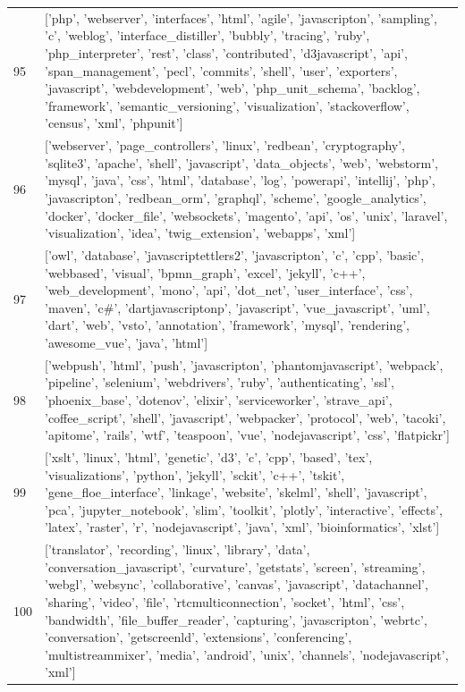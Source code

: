 \begin{center}
\begin{longtable}{|p{1.5cm}|p{12.5cm}|}
            95 & ['php', 'webserver', 'interfaces', 'html', 'agile', 'javascripton', 'sampling', 'c', 'weblog', 'interface\_distiller', 'bubbly', 'tracing', 'ruby', 'php\_interpreter', 'rest', 'class', 'contributed', 'd3javascript', 'api', 'span\_management', 'pecl', 'commits', 'shell', 'user', 'exporters', 'javascript', 'webdevelopment', 'web', 'php\_unit\_schema', 'backlog', 'framework', 'semantic\_versioning', 'visualization', 'stackoverflow', 'census', 'xml', 'phpunit']  \\ 
            96 & ['webserver', 'page\_controllers', 'linux', 'redbean', 'cryptography', 'sqlite3', 'apache', 'shell', 'javascript', 'data\_objects', 'web', 'webstorm', 'mysql', 'java', 'css', 'html', 'database', 'log', 'powerapi', 'intellij', 'php', 'javascripton', 'redbean\_orm', 'graphql', 'scheme', 'google\_analytics', 'docker', 'docker\_file', 'websockets', 'magento', 'api', 'os', 'unix', 'laravel', 'visualization', 'idea', 'twig\_extension', 'webapps', 'xml']  \\ 
            97 & ['owl', 'database', 'javascriptettlers2', 'javascripton', 'c', 'cpp', 'basic', 'webbased', 'visual', 'bpmn\_graph', 'excel', 'jekyll', 'c++', 'web\_development', 'mono', 'api', 'dot\_net', 'user\_interface', 'css', 'maven', 'c\#', 'dartjavascriptonp', 'javascript', 'vue\_javascript', 'uml', 'dart', 'web', 'vsto', 'annotation', 'framework', 'mysql', 'rendering', 'awesome\_vue', 'java', 'html']  \\ 
            98 & ['webpush', 'html', 'push', 'javascripton', 'phantomjavascript', 'webpack', 'pipeline', 'selenium', 'webdrivers', 'ruby', 'authenticating', 'ssl', 'phoenix\_base', 'dotenov', 'elixir', 'serviceworker', 'strave\_api', 'coffee\_script', 'shell', 'javascript', 'webpacker', 'protocol', 'web', 'tacoki', 'apitome', 'rails', 'wtf', 'teaspoon', 'vue', 'nodejavascript', 'css', 'flatpickr']  \\ 
            99 & ['xslt', 'linux', 'html', 'genetic', 'd3', 'c', 'cpp', 'based', 'tex', 'visualizations', 'python', 'jekyll', 'sckit', 'c++', 'tskit', 'gene\_floe\_interface', 'linkage', 'website', 'skelml', 'shell', 'javascript', 'pca', 'jupyter\_notebook', 'slim', 'toolkit', 'plotly', 'interactive', 'effects', 'latex', 'raster', 'r', 'nodejavascript', 'java', 'xml', 'bioinformatics', 'xlst']  \\ 
            100 & ['translator', 'recording', 'linux', 'library', 'data', 'conversation\_javascript', 'curvature', 'getstats', 'screen', 'streaming', 'webgl', 'websync', 'collaborative', 'canvas', 'javascript', 'datachannel', 'sharing', 'video', 'file', 'rtcmulticonnection', 'socket', 'html', 'css', 'bandwidth', 'file\_buffer\_reader', 'capturing', 'javascripton', 'webrtc', 'conversation', 'getscreenld', 'extensions', 'conferencing', 'multistreammixer', 'media', 'android', 'unix', 'channels', 'nodejavascript', 'xml']  \\ 
            
            \hline
        \end{longtable}
        \end{center}
     

